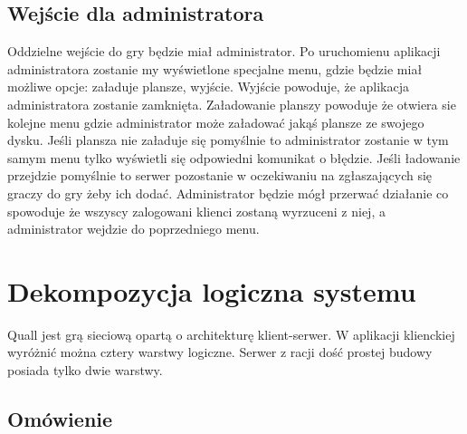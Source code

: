 \documentclass[12pt,a4paper,twoside]{article}
\begin{document}
\subsection{Wejście dla administratora}
Oddzielne wejście do gry będzie miał administrator. Po uruchomienu aplikacji administratora zostanie my wyświetlone specjalne menu, gdzie będzie miał możliwe opcje: załaduje plansze, wyjście. Wyjście powoduje, że aplikacja administratora zostanie zamknięta. Załadowanie planszy powoduje że otwiera sie kolejne menu gdzie administrator może załadować jakąś plansze ze swojego dysku. Jeśli plansza nie załaduje się pomyślnie to administrator zostanie w tym samym menu tylko wyświetli się odpowiedni komunikat o błędzie. Jeśli ładowanie przejdzie pomyślnie to serwer pozostanie w oczekiwaniu na zgłaszających się graczy do gry żeby ich dodać. Administrator będzie mógł przerwać działanie co spowoduje że wszyscy zalogowani klienci zostaną wyrzuceni z niej, a administrator wejdzie do poprzedniego menu.

\section{Dekompozycja logiczna systemu}


Quall jest grą sieciową opartą o architekturę klient-serwer. W aplikacji klienckiej wyróżnić można cztery warstwy logiczne. Serwer z racji dość prostej budowy posiada tylko dwie warstwy.

\subsection{Omówienie}

\end{document}
